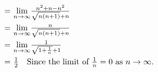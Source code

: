 \documentclass[12pt]{report}
\begin{document}
\begin{enumerate}[leftmargin=\labelsep]
\begin{enumerate}
\begin{tcolorbox}
\begin{itemize}[label={}]
\begin{equation*}
\begin{array}{r@{~=~}l}
                                & {\lim \limits_{{n\rightarrow \infty}}} \frac{n^2+n-n^2}{\sqrt{n(n+1)}+n} \\ [2ex]
                                & {\lim \limits_{{n\rightarrow \infty}}} \frac{n}{\sqrt{n(n+1)}+n} \\ [2ex]
                                & {\lim \limits_{{n\rightarrow \infty}}} \frac{1}{\sqrt{1+\frac{1}{n}}+1} \\ [2ex]
                                & \frac{1}{2} \quad \text{Since the limit of } \frac{1}{n} = 0 \text{ as } n \rightarrow \infty.
                            \end{array}
                        \end{equation*}
                    \end{itemize}
                \end{tcolorbox}
        \end{enumerate}

\newpage


\end{enumerate}
\end{document}
